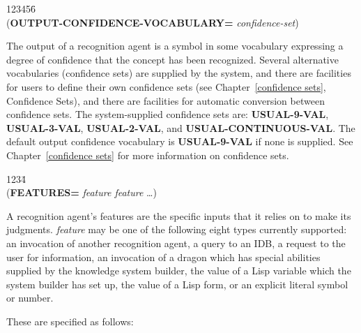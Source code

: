 \begin{tabbing}
123456\= \kill
\\
({\bf OUTPUT-CONFIDENCE-VOCABULARY=} {\it confidence-set\/}) \\
\end{tabbing}
The output of a recognition agent is a symbol in some vocabulary
expressing a degree of confidence that the concept has been
recognized.  Several alternative vocabularies (confidence sets) are
supplied by the system, and there are facilities for users to define
their own confidence sets (see Chapter~\ref{confidence sets},
Confidence Sets), and there are facilities for automatic conversion
between confidence sets.  The system-supplied confidence sets are:
{\bf USUAL-9-VAL}, {\bf USUAL-3-VAL}, {\bf USUAL-2-VAL}, and {\bf
USUAL-CONTINUOUS-VAL}. The default output confidence vocabulary is
{\bf USUAL-9-VAL} if none is supplied. See Chapter~\ref{confidence
sets} for more information on confidence sets.

\label{features}
\begin{tabbing}
1234\= \kill
\\
({\bf FEATURES=} {\it feature feature\/} \ldots) \\
\end{tabbing}
A recognition agent's features are the specific inputs that it relies
on to make its judgments.  {\it feature\/} may be one of the following
eight types currently supported: an invocation of another recognition
agent, a query to an IDB, a request to the user for information, an
invocation of a dragon which has special abilities supplied by the
knowledge system builder, the value of a Lisp variable which the
system builder has set up, the value of a Lisp form, or an explicit
literal symbol or number.

These are specified as follows:

